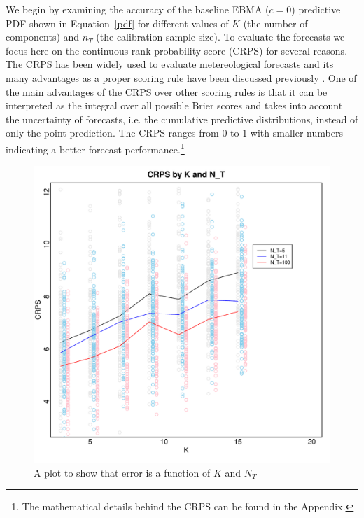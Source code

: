 \documentclass[12pt,fullpage,endnotes]{article}
\begin{document}
We begin by examining the accuracy of the baseline EBMA ($c=0$)
predictive PDF shown in Equation~\ref{pdf} for different values of $K$
(the number of components) and $n_{T}$ (the calibration sample size).
To evaluate the forecasts we focus here on the continuous rank probability score (CRPS) for several reasons. The CRPS has been widely used to evaluate metereological forecasts and its many advantages as a proper scoring rule have been discussed previously \citep{Hersbach:2000,Gneiting_Raftery_2007,GneitingEtAl:2007,brandt:freeman:schrodt:2011}. One of the main advantages of the CRPS over other scoring rules is that it can be interpreted as the integral over all possible Brier scores \citep{Brier:1950} and takes into account the uncertainty of forecasts, i.e. the cumulative predictive distributions, instead of only the point prediction. The CRPS ranges from $0$ to $1$ with smaller numbers indicating a better forecast performance.\footnote{The mathematical details behind the CRPS can be found in the Appendix.}

\begin{figure}[ht]
\caption{A plot to show that error is a function of $K$ and $N_T$}
\label{simplot1}
\centering
\includegraphics[scale=.8]{SimTemp1}
\end{figure}
\end{document}
